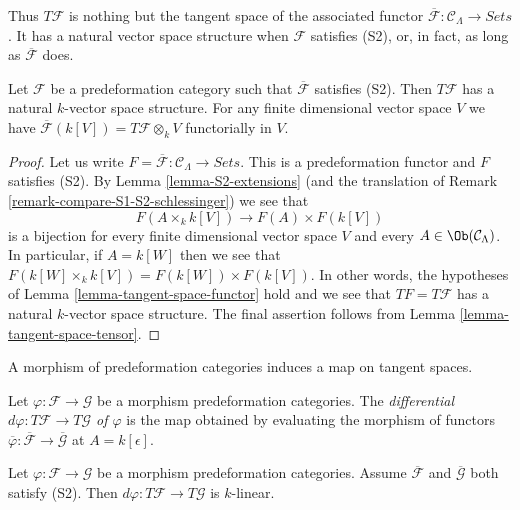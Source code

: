 \noindent
Thus $T \mathcal{F}$ is nothing but the tangent space of the associated
functor $\overline{\mathcal{F}}: \mathcal{C}_\Lambda \to \textit{Sets}$.
It has a natural vector space structure when $\mathcal{F}$ satisfies (S2),
or, in fact, as long as $\overline{\mathcal{F}}$ does.

\begin{lemma}
\label{lemma-tangent-space-vector-space}
Let $\mathcal{F}$ be a predeformation category such that
$\overline{\mathcal{F}}$ satisfies (S2). Then $T \mathcal{F}$ has a
natural $k$-vector space structure. For any finite dimensional
vector space $V$ we have
$\overline{\mathcal{F}}(k[V]) = T\mathcal{F} \otimes_k V$
functorially in $V$.
\end{lemma}

\begin{proof}
Let us write
$F = \overline{\mathcal{F}} : \mathcal{C}_\Lambda \to \textit{Sets}$.
This is a predeformation functor and $F$ satisfies (S2). By
Lemma \ref{lemma-S2-extensions}
(and the translation of
Remark \ref{remark-compare-S1-S2-schlessinger})
we see that
$$
F(A \times_k k[V]) \longrightarrow F(A) \times F(k[V])
$$
is a bijection for every finite dimensional vector space $V$ and every
$A \in \Ob(\mathcal{C}_\Lambda)$. In particular, if $A = k[W]$
then we see that $F(k[W] \times_k k[V]) = F(k[W]) \times F(k[V])$.
In other words, the hypotheses of
Lemma \ref{lemma-tangent-space-functor}
hold and we see that $TF = T \mathcal{F}$
has a natural $k$-vector space structure.
The final assertion follows from
Lemma \ref{lemma-tangent-space-tensor}.
\end{proof}

\noindent
A morphism of predeformation categories induces a map on tangent spaces.

\begin{definition}
\label{definition-differential}
Let $\varphi: \mathcal{F} \to \mathcal{G}$ be a morphism predeformation
categories. The
{\it differential $d \varphi: T \mathcal{F} \to T \mathcal{G}$ of $\varphi$}
is the map obtained by evaluating the morphism of functors
$\overline{\varphi}: \overline{\mathcal{F}} \to \overline{\mathcal{G}}$
at $A = k[\epsilon]$.
\end{definition}

\begin{lemma}
\label{lemma-k-linear-differential}
Let $\varphi: \mathcal{F} \to \mathcal{G}$ be a morphism predeformation
categories. Assume $\overline{\mathcal{F}}$ and $\overline{\mathcal{G}}$ both
satisfy (S2). Then $d \varphi: T \mathcal{F} \to T \mathcal{G}$ is $k$-linear.
\end{lemma}

